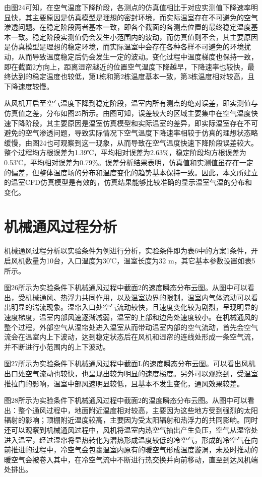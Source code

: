 \begin{enumerate}
\begin{enumerate}
由图24可知，在空气温度下降阶段，各测点的仿真值相比于对应实测值下降速率明显快，其主要原因是仿真模型是理想的密封环境，而实际温室存在不可避免的空气渗透问题。在稳定阶段两者基本一致，即各个截面的各测点位置的最终稳定温度基本一致。稳定阶段实测值仍会发生小范围内的波动，而仿真值则不会，其主要原因是仿真模型是理想的稳定环境，而实际温室中会存在各种各样不可避免的环境扰动，从而导致温度稳定后仍会发生一定的波动。变化过程中温度梯度也保持一致，即在截面2方向上，距离湿帘越近的位置空气温度下降越早，下降速率也较快，最终达到的稳定温度也较低，第1栋和第2栋温度基本一致，第3栋温度相对较高，且下降速度较慢。

从风机开启至空气温度下降到稳定阶段，温室内所有测点的绝对误差，即实测值与仿真值之差，分布如图25所示。由图可知，误差较大的区域主要集中在空气温度快速下降阶段，其主要原因是温室仿真模型和实际温室的差异，即实际温室存在不可避免的空气渗透问题，导致实际情况下空气温度下降速率相较于仿真的理想状态略缓慢，由图24也可观察到这一现象，从而导致在空气温度快速下降阶段误差较大。整个过程均方根误差为1.39℃，平均相对误差为2.63\%，稳定阶段均方根误差为0.53℃，平均相对误差为0.79\%。误差分析结果表明，仿真值和实测值虽存在一定的偏差，但整体温度场的分布和温度变化的趋势基本保持一致。因此，本文所建立的温室CFD仿真模型是有效的，仿真结果能够比较准确的显示温室气温的分布和变化。

\section{机械通风过程分析}
机械通风过程分析以实验条件为例进行分析，实验条件即为表6中的方案1条件，开启风机数量为10台，入口温度为30℃，温室长度为32 m，其它基本参数设置如表5所示。

图26所示为实验条件下机械通风过程中截面2的速度瞬态分布云图。从图中可以看出，受机械通风、热浮力共同作用，以及温室边界的限制，温室内气体流动可以看出明显的湍流现象。湿帘入口处空气流动较快，且速度变化较为剧烈，呈现明显的速度梯度，温室内部风速逐渐减弱，温室的上部和边角处速度较小。在机械通风的整个过程，外部空气从湿帘处进入温室从而带动温室内部的空气流动，首先会空气流会在温室内上下波动，达到稳定状态后在风机和湿帘的连线处形成一条空气流，并不断进行小范围内的上下波动。

图27所示为实验条件下机械通风过程中截面L的速度瞬态分布云图。可以看出风机出口处空气流动也较快，也呈现出较为明显的速度梯度。另外可以观察到，受温室推拉门的影响，温室中部风速明显较低，且基本不发生变化，通风效果较差。

图28所示为实验条件下机械通风过程中截面2的温度瞬态分布云图。从图中可以看出：整个通风过程中，地面附近温度相对较高，主要因为这些地方受到强烈的太阳辐射的影响；顶棚附近温度较高，主要因为受太阳辐射和热浮力的共同影响。同时还可以观察到机械通风过程中，风机将温室内热空气抽出产生负压，空气从湿帘处进入温室，经过湿帘将显热转化为潜热形成温度较低的冷空气，形成的冷空气在向前推进的过程中，冷空气会包裹温室内原有的暖空气形成温度漩涡，未及时推动的暖空气会被卷入其中，在冷空气流中不断进行热交换并向前移动，直至到达风机端处排出。


\end{enumerate}
\end{enumerate}
